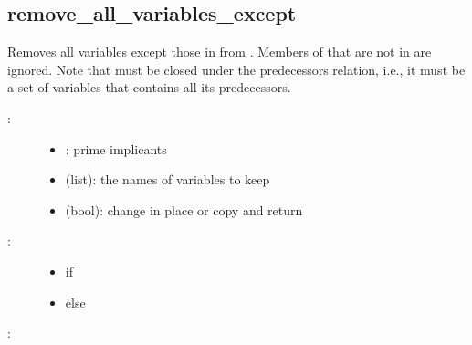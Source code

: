 \documentclass[letterpaper,10pt,english]{sphinxmanual}
\begin{document}
\subsection{remove\_all\_variables\_except}
\label{\detokenize{PrimeImplicants:id12}}\label{\detokenize{PrimeImplicants:remove-all-variables-except}}

\begin{fulllineitems}
\label{\detokenize{PrimeImplicants:PyBoolNet.PrimeImplicants.remove_all_variables_except}}
Removes all variables except those in  from .
Members of  that are not in  are ignored.
Note that  must be closed under the predecessors relation, i.e.,
it must be a set of variables that contains all its predecessors.
\begin{description}
\item[{:}] \leavevmode\begin{itemize}
\item {} 
: prime implicants

\item {} 
 (list): the names of variables to keep

\item {} 
 (bool): change  in place or copy and return

\end{itemize}

\item[{:}] \leavevmode\begin{itemize}
\item {} 
 if 

\item {} 
 else

\end{itemize}

\end{description}

:

\begin{sphinxVerbatim}[commandchars=\\\{\}]
  \PYG{p}{[}\PYG{p}{]}
 
\end{sphinxVerbatim}


\end{fulllineitems}
\end{document}
